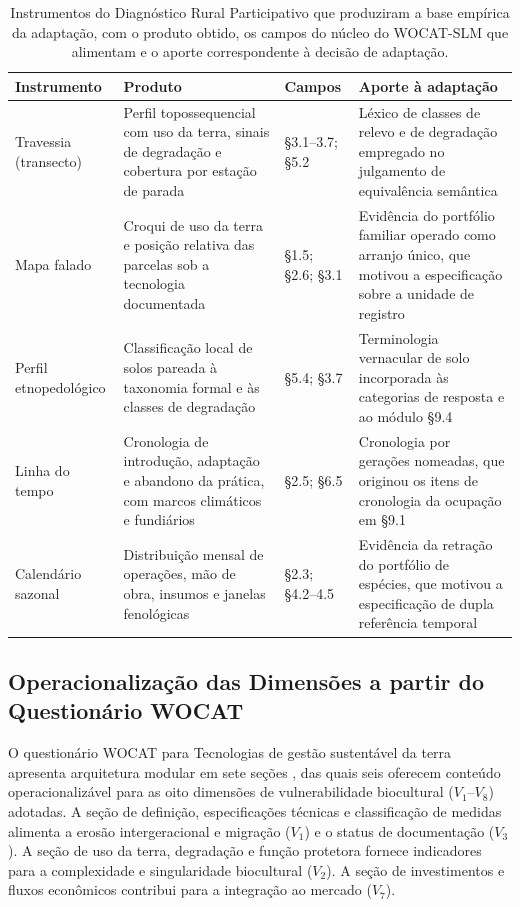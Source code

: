 \documentclass[preprint,authoryear,12pt]{elsarticle}
\newcommand{\fonte}[1]{%
  \par\vspace{2pt}\noindent{\footnotesize Fonte: #1}\par}
\begin{document}
\begin{table}[H]
\centering
\caption{Instrumentos do Diagnóstico Rural Participativo que produziram a base empírica da adaptação, com o produto obtido, os campos do núcleo do WOCAT-SLM que alimentam e o aporte correspondente à decisão de adaptação.}
\label{tab:drp_adaptacao}
\footnotesize
\setlength{\tabcolsep}{4pt}
\begin{tabular}{p{2.5cm}p{3.9cm}p{1.9cm}p{4.6cm}}
\toprule
\textbf{Instrumento} & \textbf{Produto} & \textbf{Campos} & \textbf{Aporte à adaptação} \\
\midrule
Travessia (transecto) & Perfil topossequencial com uso da terra, sinais de degradação e cobertura por estação de parada & §3.1--3.7; §5.2 & Léxico de classes de relevo e de degradação empregado no julgamento de equivalência semântica \\
\addlinespace
Mapa falado & Croqui de uso da terra e posição relativa das parcelas sob a tecnologia documentada & §1.5; §2.6; §3.1 & Evidência do portfólio familiar operado como arranjo único, que motivou a especificação sobre a unidade de registro \\
\addlinespace
Perfil etnopedológico & Classificação local de solos pareada à taxonomia formal e às classes de degradação & §5.4; §3.7 & Terminologia vernacular de solo incorporada às categorias de resposta e ao módulo §9.4 \\
\addlinespace
Linha do tempo & Cronologia de introdução, adaptação e abandono da prática, com marcos climáticos e fundiários & §2.5; §6.5 & Cronologia por gerações nomeadas, que originou os itens de cronologia da ocupação em §9.1 \\
\addlinespace
Calendário sazonal & Distribuição mensal de operações, mão de obra, insumos e janelas fenológicas & §2.3; §4.2--4.5 & Evidência da retração do portfólio de espécies, que motivou a especificação de dupla referência temporal \\
\bottomrule
\end{tabular}
\fonte{\textbf{Elaborado pelos autores} (2026).}
\end{table}

\subsection{Operacionalização das Dimensões a partir do Questionário WOCAT}

O questionário WOCAT para Tecnologias de gestão sustentável da terra apresenta arquitetura modular em sete seções \citep{Liniger2019}, das quais seis oferecem conteúdo operacionalizável para as oito dimensões de vulnerabilidade biocultural ($V_1$--$V_8$) adotadas. A seção de definição, especificações técnicas e classificação de medidas alimenta a erosão intergeracional e migração ($V_1$) e o status de documentação ($V_3$). A seção de uso da terra, degradação e função protetora fornece indicadores para a complexidade e singularidade biocultural ($V_2$). A seção de investimentos e fluxos econômicos contribui para a integração ao mercado ($V_7$). 
\end{document}
